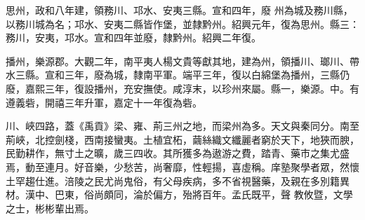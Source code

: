 \begin{pinyinscope}
 思州，政和八年建，領務川、邛水、安夷三縣。宣和四年，廢
 州為城及務川縣，以務川城為名；邛水、安夷二縣皆作堡，並隸黔州。紹興元年，復為思州。縣三：務川，安夷，邛水。宣和四年並廢，隸黔州。紹興二年復。



 播州，樂源郡。大觀二年，南平夷人楊文貴等獻其地，建為州，領播川、瑯川、帶水三縣。宣和三年，廢為城，隸南平軍。端平三年，復以白綿堡為播州，三縣仍廢，嘉熙三年，復設播州，充安撫使。咸淳末，以珍州來屬。縣一，樂源。中。有遵義砦，開禧三年升軍，嘉定十一年復為砦。



 川、峽四路，蓋《禹貢》梁、雍、荊三州之地，而梁州為多。天文與秦同分。南至荊峽，北控劍棧，西南接蠻夷。土植宜柘，繭絲織文纖麗者窮於天下，地狹而腴，民勤耕作，無寸土之曠，歲三四收。其所獲多為遨游之費，踏青、藥市之集尤盛焉，動至連月。好音樂，少愁苦，尚奢靡，性輕揚，喜虛稱。庠塾聚學者眾，然懷土罕趨仕進。涪陵之民尤尚鬼俗，有父母疾病，多不省視醫藥，及親在多別籍異材。漢中、巴東，俗尚頗同，淪於偏方，殆將百年。孟氏既平，聲
 教攸暨，文學之士，彬彬輩出焉。



\end{pinyinscope}